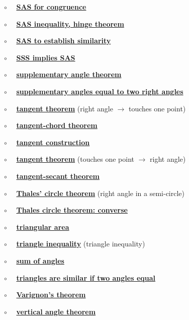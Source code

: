 \documentclass[11pt, oneside]{article}
\begin{document}
$\circ$ \ \ \hyperref[sec:SAS]{\textbf{SAS for congruence}}

$\circ$ \ \ \hyperref[sec:hinge_theorem]{\textbf{SAS inequality, hinge theorem}}

$\circ$ \ \ \hyperref[sec:SAS_similar]{\textbf{SAS to establish similarity}}

$\circ$ \ \ \hyperref[sec:SSS_implies_SAS]{\textbf{SSS implies SAS}}

$\circ$ \ \ \hyperref[sec:supplementary_angle_theorem]{\textbf{supplementary angle theorem}}

$\circ$ \ \ \hyperref[sec:two_supplementary_equal_two_right]{\textbf{supplementary angles equal to two right angles}}

$\circ$ \ \ \hyperref[sec:tangent_one_point]{\textbf{tangent theorem}} (right angle $\rightarrow$ touches one point)

$\circ$ \ \ \hyperref[sec:tangent_chord_theorem]{\textbf{tangent-chord theorem}}

$\circ$ \ \ \hyperref[sec:tangent_construction]{\textbf{tangent construction}}

$\circ$ \ \ \hyperref[sec:tangent_perpendicular]{\textbf{tangent theorem}} (touches one point $\rightarrow$ right angle)

$\circ$ \ \ \hyperref[sec:tangent_secant_theorem]{\textbf{tangent-secant theorem}}

$\circ$ \ \ \hyperref[sec:Thales_theorem]{\textbf{Thales' circle theorem}} (right angle in a semi-circle)

$\circ$ \ \ \hyperref[sec:Thales_circle_theorem_converse]{\textbf{Thales circle theorem:  converse}}

$\circ$ \ \ \hyperref[sec:triangle_area]{\textbf{triangular area}}

$\circ$ \ \ \hyperref[sec:triangle_inequality]{\textbf{triangle inequality}} (triangle inequality)

$\circ$ \ \  \hyperref[sec:triangle_sum_theorem]{\textbf{sum of angles}}

$\circ$ \ \ \hyperref[sec:two_angles_similar]{\textbf{triangles are similar if two angles equal}}

$\circ$ \ \ \hyperref[sec:Varignon_theorem]{\textbf{Varignon's theorem}}

$\circ$ \ \ \hyperref[sec:vertical_angle_theorem]{\textbf{vertical angle theorem}}
\end{document}
